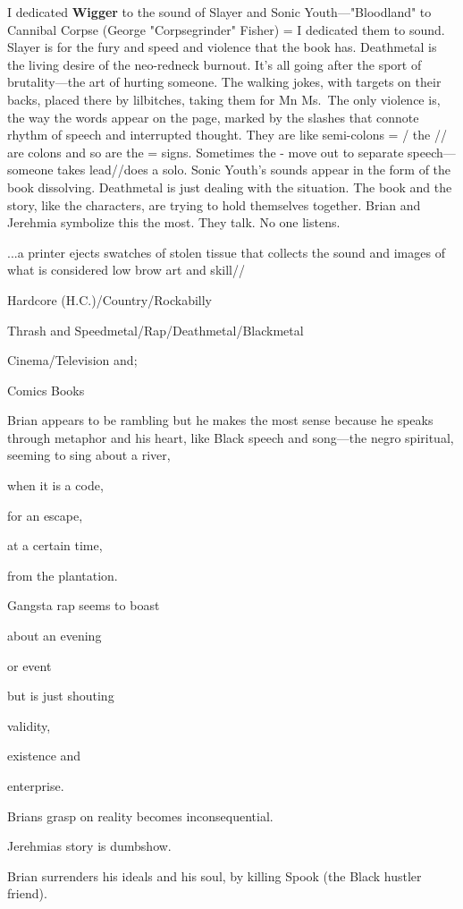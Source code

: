 I dedicated \textbf{Wigger} to the sound of Slayer and Sonic
Youth---"Bloodland" to Cannibal Corpse (George "Corpsegrinder" Fisher) =
I dedicated them to sound. Slayer is for the fury and speed and violence
that the book has. Deathmetal is the living desire of the neo-redneck
burnout. It's all going after the sport of brutality---the art of
hurting someone. The walking jokes, with targets on their backs, placed
there by lilbitches, taking them for Mn Ms.~The only violence is, the
way the words appear on the page, marked by the slashes that connote
rhythm of speech and interrupted thought. They are like semi-colons = /
the // are colons and so are the = signs. Sometimes the - move out to
separate speech---someone takes lead//does a solo. Sonic Youth's sounds
appear in the form of the book dissolving. Deathmetal is just dealing
with the situation. The book and the story, like the characters, are
trying to hold themselves together. Brian and Jerehmia symbolize this
the most. They talk. No one listens.

...a printer ejects swatches of stolen tissue that collects the sound
and images of what is considered low brow art and skill//

Hardcore (H.C.)/Country/Rockabilly

Thrash and Speedmetal/Rap/Deathmetal/Blackmetal

Cinema/Television and;

Comics Books

Brian appears to be rambling but he makes the most sense because he
speaks through metaphor and his heart, like Black speech and song---the
negro spiritual, seeming to sing about a river,

when it is a code,

for an escape,

at a certain time,

from the plantation.

Gangsta rap seems to boast

about an evening

or event

but is just shouting

validity,

existence and

enterprise.

Brians grasp on reality becomes inconsequential.

Jerehmias story is dumbshow.

Brian surrenders his ideals and his soul, by killing Spook (the Black
hustler friend).

